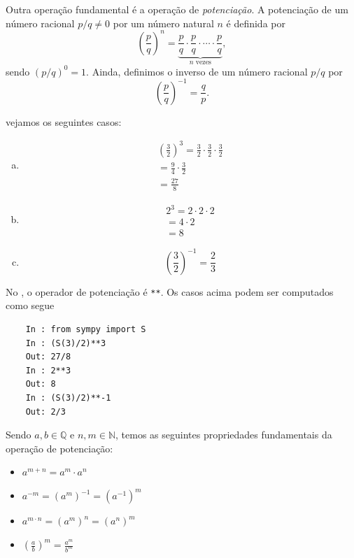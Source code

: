 Outra operação fundamental é a operação de \emph{potenciação}. A potenciação de um número racional $p/q\neq 0$ por um número natural $n$ é definida por
\begin{equation}
  \left(\frac{p}{q}\right)^n = \underbrace{\frac{p}{q}\cdot\frac{p}{q}\cdot\cdots\cdot\frac{p}{q}}_{n\text{ vezes}},
\end{equation}
sendo $(p/q)^0 = 1$. Ainda, definimos o inverso de um número racional $p/q$ por
\begin{equation}
  \left(\frac{p}{q}\right)^{-1} = \frac{q}{p}.
\end{equation}

\begin{ex}
  vejamos os seguintes casos:
  \begin{enumerate}[a)]
  \item
    \begin{gather}
      \left(\frac{3}{2}\right)^3 = \frac{3}{2}\cdot\frac{3}{2}\cdot\frac{3}{2} \\
      = \frac{9}{4}\cdot\frac{3}{2} \\
      = \frac{27}{8}
    \end{gather}
  \item
    \begin{gather}
      2^3 = 2\cdot 2 \cdot 2 \\
      = 4\cdot 2\\
      = 8
    \end{gather}
  \item
    \begin{equation}
      \left(\frac{3}{2}\right)^{-1} = \frac{2}{3}
    \end{equation}
  \end{enumerate}

  \ifispython
  No \python, o operador de potenciação é \lstinline!**!. Os casos acima podem ser computados como segue
  \begin{lstlisting}
    In : from sympy import S
    In : (S(3)/2)**3
    Out: 27/8
    In : 2**3
    Out: 8
    In : (S(3)/2)**-1
    Out: 2/3
  \end{lstlisting}
  \fi
\end{ex}

Sendo $a,b\in\mathbb{Q}$ e $n, m\in\mathbb{N}$, temos as seguintes propriedades fundamentais da operação de potenciação:
\begin{itemize}
\item $a^{m+n} = a^m\cdot a^n$
\item $\displaystyle a^{-m} = \left(a^m\right)^{-1} = \left(a^{-1}\right)^m$
\item $\displaystyle a^{m\cdot n} = \left(a^m\right)^n = \left(a^n\right)^m$
\item $\displaystyle \left(\frac{a}{b}\right)^m = \frac{a^m}{b^m}$
\end{itemize}

